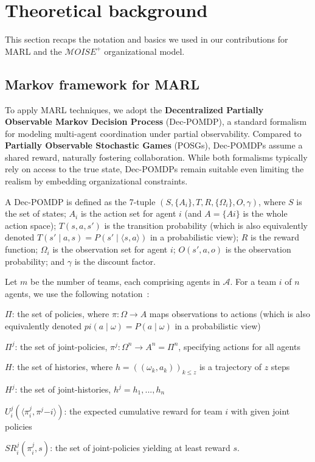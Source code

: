 \documentclass[pdflatex,sn-mathphys-num]{sn-jnl}%
\theoremstyle{thmstyleone}%
\theoremstyle{thmstyletwo}%
\theoremstyle{thmstylethree}%
\begin{document}


\section{Theoretical background}\label{sec:background}

This section recaps the notation and basics we used in our contributions for MARL and the $\mathcal{M}OISE^+$ organizational model.

\subsection{Markov framework for MARL}
\label{sec:dec-pomdp}

To apply MARL techniques, we adopt the \textbf{Decentralized Partially Observable Markov Decision Process} (Dec-POMDP)\cite{Oliehoek2016}, a standard formalism for modeling multi-agent coordination under partial observability. Compared to \textbf{Partially Observable Stochastic Games} (POSGs), Dec-POMDPs assume a shared reward, naturally fostering collaboration\cite{Matignon2007}. While both formalisms typically rely on access to the true state, Dec-POMDPs remain suitable even limiting the realism by embedding organizational constraints.

A Dec-POMDP is defined as the 7-tuple $\left(S, \{A_i\}, T, R, \{\Omega_i\}, O, \gamma \right)$, where $S$ is the set of states; $A_i$ is the action set for agent $i$ (and $A = \{Ai\}$ is the whole action space); $T(s, a, s')$ is the transition probability (which is also equivalently denoted $T(s' \mid a, s) = P(s' \mid \langle s, a \rangle)$ in a probabilistic view); $R$ is the reward function; $\Omega_i$ is the observation set for agent $i$; $O(s', a, o)$ is the observation probability; and $\gamma$ is the discount factor.

Let $m$ be the number of teams, each comprising agents in $\mathcal{A}$. For a team $i$ of $n$ agents, we use the following notation~\cite{Matignon2007,Yuan2023}:
%
\begin{enumerate*}[label={\roman*)}, itemjoin={; \quad}]
    \item $\Pi$: the set of policies, where $\pi: \Omega \rightarrow A$ maps observations to actions (which is also equivalently denoted $pi(a \mid \omega) = P(a \mid \omega)$ in a probabilistic view)
    \item $\Pi^j$: the set of joint-policies, $\pi^j: \Omega^n \rightarrow A^n = \Pi^n$, specifying actions for all agents
    \item $H$: the set of histories, where $h = ((\omega_k, a_k))_{k \leq z}$ is a trajectory of $z$ steps
    \item $H^j$: the set of joint-histories, $h^j = {h_1, ..., h_n}$
    \item $U^j_i(\langle \pi^j_i, \pi^j{-i} \rangle)$: the expected cumulative reward for team $i$ with given joint policies
    \item $SR^j_i(\pi^j_i, s)$: the set of joint-policies yielding at least reward $s$.
\end{enumerate*}
\end{document}
